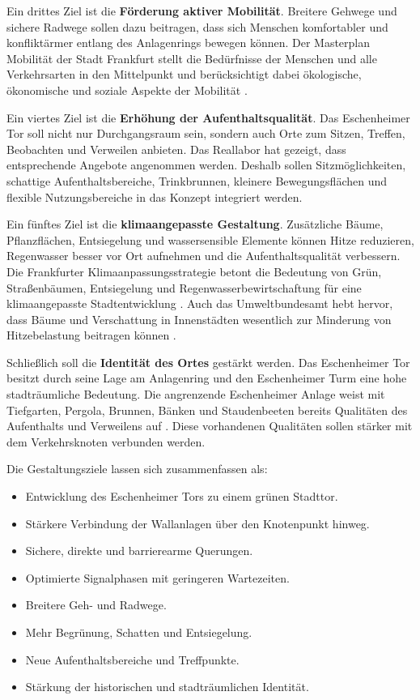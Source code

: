 \documentclass[a4paper,12pt]{article}
\begin{document}
Ein drittes Ziel ist die \textbf{Förderung aktiver Mobilität}. Breitere Gehwege und sichere Radwege sollen dazu beitragen, dass sich Menschen komfortabler und konfliktärmer entlang des Anlagenrings bewegen können. Der Masterplan Mobilität der Stadt Frankfurt stellt die Bedürfnisse der Menschen und alle Verkehrsarten in den Mittelpunkt und berücksichtigt dabei ökologische, ökonomische und soziale Aspekte der Mobilität \autocite{stadtfrankfurtmasterplan2025}.

Ein viertes Ziel ist die \textbf{Erhöhung der Aufenthaltsqualität}. Das Eschenheimer Tor soll nicht nur Durchgangsraum sein, sondern auch Orte zum Sitzen, Treffen, Beobachten und Verweilen anbieten. Das Reallabor hat gezeigt, dass entsprechende Angebote angenommen werden. Deshalb sollen Sitzmöglichkeiten, schattige Aufenthaltsbereiche, Trinkbrunnen, kleinere Bewegungsflächen und flexible Nutzungsbereiche in das Konzept integriert werden.

Ein fünftes Ziel ist die \textbf{klimaangepasste Gestaltung}. Zusätzliche Bäume, Pflanzflächen, Entsiegelung und wassersensible Elemente können Hitze reduzieren, Regenwasser besser vor Ort aufnehmen und die Aufenthaltsqualität verbessern. Die Frankfurter Klimaanpassungsstrategie betont die Bedeutung von Grün, Straßenbäumen, Entsiegelung und Regenwasserbewirtschaftung für eine klimaangepasste Stadtentwicklung \autocite{stadtfrankfurtklimaanpassung2026}. Auch das Umweltbundesamt hebt hervor, dass Bäume und Verschattung in Innenstädten wesentlich zur Minderung von Hitzebelastung beitragen können \autocite{umweltbundesamt2022}.

Schließlich soll die \textbf{Identität des Ortes} gestärkt werden. Das Eschenheimer Tor besitzt durch seine Lage am Anlagenring und den Eschenheimer Turm eine hohe stadträumliche Bedeutung. Die angrenzende Eschenheimer Anlage weist mit Tiefgarten, Pergola, Brunnen, Bänken und Staudenbeeten bereits Qualitäten des Aufenthalts und Verweilens auf \autocite{stadtfrankfurteschenheimeranlage2026}. Diese vorhandenen Qualitäten sollen stärker mit dem Verkehrsknoten verbunden werden.

Die Gestaltungsziele lassen sich zusammenfassen als:

\begin{itemize}
	\item Entwicklung des Eschenheimer Tors zu einem grünen Stadttor.
	\item Stärkere Verbindung der Wallanlagen über den Knotenpunkt hinweg.
	\item Sichere, direkte und barrierearme Querungen.
	\item Optimierte Signalphasen mit geringeren Wartezeiten.
	\item Breitere Geh- und Radwege.
	\item Mehr Begrünung, Schatten und Entsiegelung.
	\item Neue Aufenthaltsbereiche und Treffpunkte.
	\item Stärkung der historischen und stadträumlichen Identität.
\end{itemize}
\end{document}
